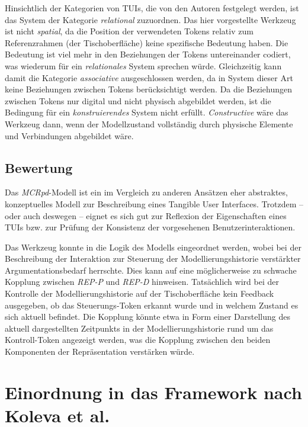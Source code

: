 Hinsichtlich der Kategorien von \glspl{TUI}, die von den Autoren festgelegt werden, ist das System der Kategorie \emph{relational} zuzuordnen. Das hier vorgestellte Werkzeug ist nicht \emph{spatial}, da die Position der verwendeten Tokens relativ zum Referenzrahmen (der Tischoberfläche) keine spezifische Bedeutung haben. Die Bedeutung ist viel mehr in den Beziehungen der Tokens untereinander codiert, was wiederum für ein \emph{relationales} System sprechen würde. Gleichzeitig kann damit die Kategorie \emph{associative} ausgeschlossen werden, da in System dieser Art keine Beziehungen zwischen Tokens berücksichtigt werden. Da die Beziehungen zwischen Tokens nur digital und nicht physisch abgebildet werden, ist die Bedingung für ein \emph{konstruierendes} System nicht erfüllt. \emph{Constructive} wäre das Werkzeug dann, wenn der Modellzustand vollständig durch physische Elemente und Verbindungen abgebildet wäre.

\subsection{Bewertung}

Das \emph{MCRpd}-Modell ist ein im Vergleich zu anderen Ansätzen eher abstraktes, konzeptuelles Modell zur Beschreibung eines Tangible User Interfaces. Trotzdem -- oder auch deswegen -- eignet es sich gut zur Reflexion der Eigenschaften eines \glspl{TUI} bzw. zur Prüfung der Konsistenz der vorgesehenen Benutzerinteraktionen.

Das Werkzeug konnte in die Logik des Modells eingeordnet werden, wobei bei der Beschreibung der Interaktion zur Steuerung der Modellierungshistorie verstärkter Argumentationsbedarf herrschte. Dies kann auf eine möglicherweise zu schwache Kopplung zwischen \emph{REP-P} und \emph{REP-D} hinweisen. Tatsächlich wird bei der Kontrolle der Modellierungshistorie auf der Tischoberfläche kein Feedback ausgegeben, ob das Steuerungs-Token erkannt wurde und in welchem Zustand es sich aktuell befindet. Die Kopplung könnte etwa in Form einer Darstellung des aktuell dargestellten Zeitpunkts in der Modellierungshistorie rund um das Kontroll-Token angezeigt werden, was die Kopplung zwischen den beiden Komponenten der Repräsentation verstärken würde.


\section{Einordnung in das Framework nach Koleva et al.} %
\label{sec:einordnung_in_das_framework_nach_koleva_et_al_}

